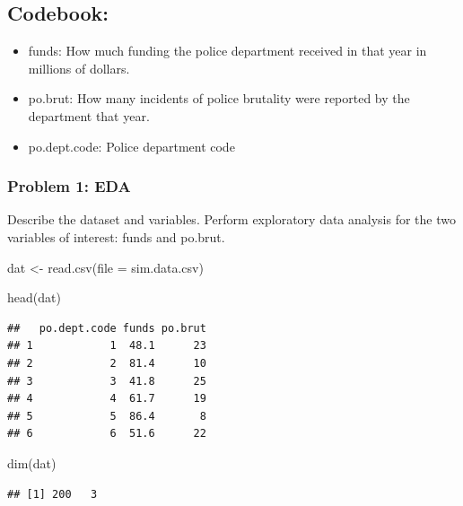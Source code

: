 \documentclass[
]{article}
\newenvironment{Shaded}{\begin{snugshade}}{\end{snugshade}}
\newcommand{\AttributeTok}[1]{\textcolor[rgb]{0.77,0.63,0.00}{#1}}
\newcommand{\FunctionTok}[1]{\textcolor[rgb]{0.00,0.00,0.00}{#1}}
\newcommand{\NormalTok}[1]{#1}
\newcommand{\OtherTok}[1]{\textcolor[rgb]{0.56,0.35,0.01}{#1}}
\newcommand{\StringTok}[1]{\textcolor[rgb]{0.31,0.60,0.02}{#1}}
\providecommand{\tightlist}{%
  \setlength{\itemsep}{0pt}\setlength{\parskip}{0pt}}
\begin{document}
\hypertarget{codebook}{%
\subsection{Codebook:}\label{codebook}}

\begin{itemize}
\tightlist
\item
  funds: How much funding the police department received in that year in
  millions of dollars.
\item
  po.brut: How many incidents of police brutality were reported by the
  department that year.
\item
  po.dept.code: Police department code
\end{itemize}

\hypertarget{problem-1-eda}{%
\subsubsection{Problem 1: EDA}\label{problem-1-eda}}

Describe the dataset and variables. Perform exploratory data analysis
for the two variables of interest: funds and po.brut.

\begin{Shaded}
\begin{Highlighting}[]
\NormalTok{dat }\OtherTok{\textless{}{-}} \FunctionTok{read.csv}\NormalTok{(}\AttributeTok{file =} \StringTok{\textquotesingle{}sim.data.csv\textquotesingle{}}\NormalTok{)}

\FunctionTok{head}\NormalTok{(dat)}
\end{Highlighting}
\end{Shaded}

\begin{verbatim}
##   po.dept.code funds po.brut
## 1            1  48.1      23
## 2            2  81.4      10
## 3            3  41.8      25
## 4            4  61.7      19
## 5            5  86.4       8
## 6            6  51.6      22
\end{verbatim}

\begin{Shaded}
\begin{Highlighting}[]
\FunctionTok{dim}\NormalTok{(dat)}
\end{Highlighting}
\end{Shaded}

\begin{verbatim}
## [1] 200   3
\end{verbatim}
\end{document}
